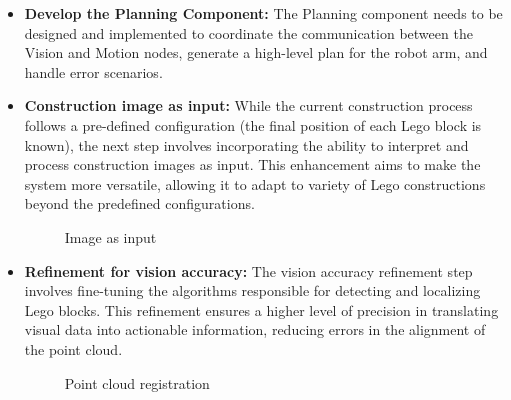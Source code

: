 \documentclass{article}
\begin{document}
	\begin{itemize}
		\item \textbf{Develop the Planning Component:} The Planning component needs to be designed and implemented to coordinate the communication between the Vision and Motion nodes, generate a high-level plan for the robot arm, and handle error scenarios.
		\item \textbf{Construction image as input:} While the current construction process follows a pre-defined configuration (the final position of each Lego block is known), the next step involves incorporating the ability to interpret and process construction images as input. This enhancement aims to make the system more versatile, allowing it to adapt to variety of Lego constructions beyond the predefined configurations.
		\begin{figure}[!ht]
			\centering
			\caption{Image as input}
			\label{fig:input-image}
		\end{figure}
		\item \textbf{Refinement for vision accuracy:} The vision accuracy refinement step involves fine-tuning the algorithms responsible for detecting and localizing Lego blocks. This refinement ensures a higher level of precision in translating visual data into actionable information, reducing errors in the alignment of the point cloud.
		\begin{figure}[!ht]
			\centering
			\caption{Point cloud registration}
			\label{fig:pointcloud-wrong}
		\end{figure}
	\end{itemize}
	
\end{document}
